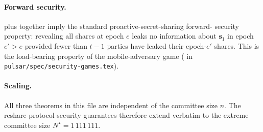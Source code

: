 \paragraph{Forward security.}
 plus 
together imply the standard proactive-secret-sharing forward-
security property: revealing all shares at epoch $e$ leaks no
information about $\mathbf{s}_1$ in epoch $e' > e$ provided fewer
than $t-1$ parties have leaked their epoch-$e'$ shares. This is
the load-bearing property of the mobile-adversary game
( in \texttt{pulsar/spec/security-games.tex}).

\paragraph{Scaling.}
All three theorems in this file are independent of the committee
size $n$. The reshare-protocol security guarantees therefore
extend verbatim to the extreme committee size $N^\star =
1\,111\,111$.
